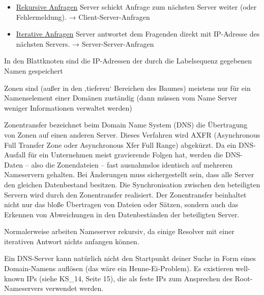 \begin{itemize}
    \item \underline{Rekursive Anfragen} Server schickt Anfrage zum nächsten Server weiter (oder Fehlermeldung).
    → Client-Server-Anfragen
    \item \underline{Iterative Anfragen} Server antwortet dem Fragenden direkt mit IP-Adresse des nächsten Servers.
    → Server-Server-Anfragen
\end{itemize}

In den Blattknoten sind die IP-Adressen der durch die Labelsequenz gegebenen Namen gespeichert

Zonen sind (außer in den ‚tieferen‘ Bereichen des Baumes) meistens nur für ein Namenselement einer Domänen zuständig (dann müssen vom Name Server weniger Informationen verwaltet werden)

Zonentransfer bezeichnet beim Domain Name System (DNS) die Übertragung von Zonen auf einen anderen Server.
Dieses Verfahren wird AXFR (Asynchronous Full Transfer Zone oder Asynchronous Xfer Full Range) abgekürzt.
Da ein DNS-Ausfall für ein Unternehmen meist gravierende Folgen hat, werden die DNS-Daten – also die Zonendateien – fast ausnahmslos identisch auf mehreren Nameservern gehalten.
Bei Änderungen muss sichergestellt sein, dass alle Server den gleichen Datenbestand besitzen.
Die Synchronisation zwischen den beteiligten Servern wird durch den Zonentransfer realisiert.
Der Zonentransfer beinhaltet nicht nur das bloße Übertragen von Dateien oder Sätzen, sondern auch das Erkennen von Abweichungen in den Datenbeständen der beteiligten Server.


Normalerweise arbeiten Nameserver rekursiv, da einige Resolver mit einer iterativen Antwort nichts anfangen können.

Ein DNS-Server kann natürlich nicht den Startpunkt deiner Suche in Form eines Domain-Namens auflösen (das wäre ein Henne-Ei-Problem).
Es existieren well-known IPs (siehe KS\_14, Seite 15), die als feste IPs zum Ansprechen des Root-Nameservers verwendet werden.

